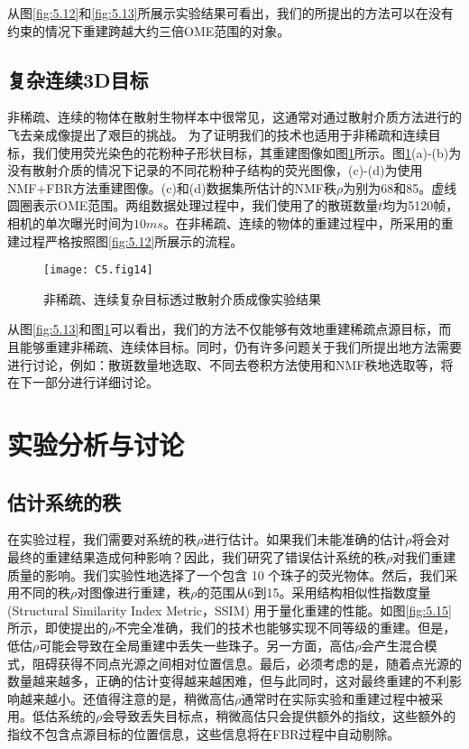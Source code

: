 从图\ref{fig:5.12}和\ref{fig:5.13}所展示实验结果可看出，我们的所提出的方法可以在没有约束的情况下重建跨越大约三倍OME范围的对象。

\subsection{复杂连续3D目标}

非稀疏、连续的物体在散射生物样本中很常见，这通常对通过散射介质方法进行的飞去亲成像提出了艰巨的挑战。 为了证明我们的技术也适用于非稀疏和连续目标，我们使用荧光染色的花粉种子形状目标，其重建图像如图\ref{fig:5.14}所示。图\ref{fig:5.14}(a)-(b)为没有散射介质的情况下记录的不同花粉种子结构的荧光图像，(c)-(d)为使用 NMF+FBR方法重建图像。(c)和(d)数据集所估计的NMF秩$\rho$为别为68和85。虚线圆圈表示OME范围。两组数据处理过程中，我们使用了的散斑数量$t$均为5120帧，相机的单次曝光时间为$10 ms$。在非稀疏、连续的物体的重建过程中，所采用的重建过程严格按照图\ref{fig:5.12}所展示的流程。

\begin{figure}[htp]
	\centering
	\texttt{[image: C5.fig14]}
	\caption{非稀疏、连续复杂目标透过散射介质成像实验结果}
	\label{fig:5.14}
\end{figure}

从图\ref{fig:5.13}和图\ref{fig:5.14}可以看出，我们的方法不仅能够有效地重建稀疏点源目标，而且能够重建非稀疏、连续体目标。同时，仍有许多问题关于我们所提出地方法需要进行讨论，例如：散斑数量地选取、不同去卷积方法使用和NMF秩地选取等，将在下一部分进行详细讨论。

\section{实验分析与讨论}

\subsection{估计系统的秩}
在实验过程，我们需要对系统的秩$\rho$进行估计。如果我们未能准确的估计$\rho$将会对最终的重建结果造成何种影响？因此，我们研究了错误估计系统的秩$\rho$对我们重建质量的影响。我们实验性地选择了一个包含 10 个珠子的荧光物体。然后，我们采用不同的秩$\rho$对图像进行重建，秩$\rho$的范围从6到15。采用结构相似性指数度量 (Structural Similarity Index Metric，SSIM) \cite{Daoud2017} 用于量化重建的性能。如图\ref{fig:5.15} 所示，即使提出的$\rho$不完全准确，我们的技术也能够实现不同等级的重建。但是，低估$\rho$可能会导致在全局重建中丢失一些珠子。另一方面，高估$\rho$会产生混合模式，阻碍获得不同点光源之间相对位置信息。最后，必须考虑的是，随着点光源的数量越来越多，正确的估计变得越来越困难，但与此同时，这对最终重建的不利影响越来越小。还值得注意的是，稍微高估$\rho$通常时在实际实验和重建过程中被采用。低估系统的$\rho$会导致丢失目标点，稍微高估只会提供额外的指纹，这些额外的指纹不包含点源目标的位置信息，这些信息将在FBR过程中自动剔除。

